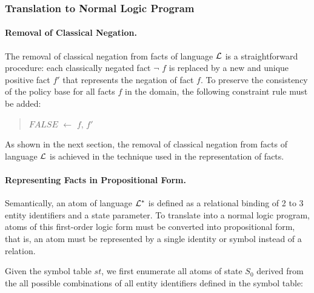 \documentclass[10pt, twocolumn]{article}
\begin{document}
      \subsubsection{Translation to Normal Logic Program}

        \paragraph{Removal of Classical Negation.}

          The removal of classical negation from facts of language ${\cal L}$
          is a straightforward procedure: each classically negated fact
          $\lnot$ $f$ is replaced by a new and unique positive fact $f'$ that
          represents the negation of fact $f$. To preserve the consistency of
          the policy base for all facts $f$ in the domain, the following
          constraint rule must be added:

          \begin{quote}
            $FALSE$ $\leftarrow$ $f$, $f'$
          \end{quote}

          As shown in the next section, the removal of classical negation from
          facts of language $\cal{L}$ is achieved in the technique used in the
          representation of facts.

        \paragraph{Representing Facts in Propositional Form.}

          Semantically, an atom of language ${\cal L}^{*}$ is defined as a
          relational binding of 2 to 3 entity identifiers and a state
          parameter. To translate into a normal logic program, atoms of this
          first-order logic form must be converted into propositional form,
          that is, an atom must be represented by a single identity or symbol
          instead of a relation.

          Given the symbol table $st$, we first enumerate all atoms of state
          $S_{0}$ derived from the all possible combinations of all entity
          identifiers defined in the symbol table:
\end{document}
